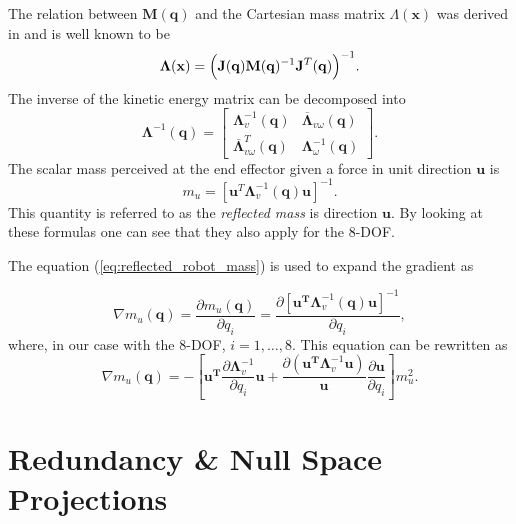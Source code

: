 The relation between $\mathbf{M}(\mathbf{q})$ and the Cartesian mass matrix $\Lambda(\mathbf{x})$ was derived in \cite{khatib1995} and is well known to be 
\begin{equation}
\mathbf{\Lambda}(\mathbf{x}) = \Bigl ( \mathbf{J}(\mathbf{q}) \mathbf{M}(\mathbf{q})^{-1} \mathbf{J}^{T}(\mathbf{q}) \Bigr )^{-1}. \label{eq:lambda}
\end{equation}
The inverse of the kinetic energy matrix can be decomposed into
\begin{equation}
\mathbf{\Lambda}^{-1}(\mathbf{q}) = 
\begin{bmatrix}
\mathbf{\Lambda}_{v}^{-1}(\mathbf{q}) & \overline{\mathbf{\Lambda}}_{v\omega}(\mathbf{q}) \\
\overline{\mathbf{\Lambda}}_{v\omega}^T(\mathbf{q}) & \mathbf{\Lambda}_{\omega}^{-1}(\mathbf{q})
\end{bmatrix}.
\end{equation}
The scalar mass perceived at the end effector given a force in unit direction $\mathbf{u}$ is
\begin{equation}
m_{u} = [\mathbf{u}^T \mathbf{\Lambda}_{v}^{-1}(\mathbf{q})   \mathbf{u}]^{-1}   .  \label{eq:reflected_robot_mass} 
\end{equation}
This quantity is referred to as the \emph{reflected mass} is direction $\mathbf{u}$. By looking at these formulas one can see that they also apply for the 8-DOF.

The equation (\ref{eq:reflected_robot_mass}) is used to expand the gradient as

\begin{equation}
\nabla m_u(\mathbf{q}) = 
\frac{\partial {m_u(\mathbf{q})}}{\partial {q_i}} = \frac{\partial {[\mathbf{u^T} \mathbf{\Lambda}_{v}^{-1}(\mathbf{q}) \mathbf{u}]^{-1}}}{\partial {q_i}}, \label{eq:grad_refl_mass_1}
\end{equation}
where, in our case with the 8-DOF,  $i = 1, \dots, 8$. This equation can be rewritten as
\begin{equation}
\nabla m_u(\mathbf{q}) = - \left [ \mathbf{u^T} \frac{\partial {\mathbf{\Lambda}_{v}^{-1}}}{\partial {q_i}} \mathbf{u} +
\frac{\partial {(\mathbf{u^T} \mathbf{\Lambda}_{v}^{-1} \mathbf{u})}}{\mathbf{u}} \frac{\partial {\mathbf{u}}}{\partial {q_i}} \right ] m_u^2	. \label{eq:grad_refl_mass_2}
\end{equation}

\section{Redundancy \& Null Space Projections }
\label{subsec:nsprojection}

